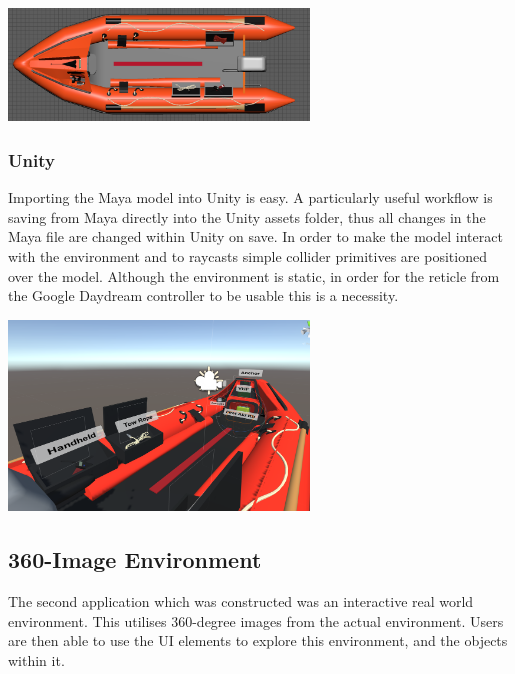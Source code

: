 \documentclass[a4paper, openright, twoside]{report}
\begin{document}
\begin{center}
\hfill \break
\includegraphics[width=0.6\textwidth]{images/top_model}
\label{model}
\hfill \break
\end{center}


\subsubsection{Unity}
Importing the Maya model into Unity is easy. A particularly useful workflow is saving from Maya directly into the Unity assets folder, thus all changes in the Maya file are changed within Unity on save. In order to make the model interact with the environment and to raycasts simple collider primitives are positioned over the model. Although the environment is static, in order for the reticle from the Google Daydream controller to be usable this is a necessity.  

\begin{center}
\hfill \break
\includegraphics[width=0.6\textwidth]{images/model_unity}
\label{model}
\hfill \break
\end{center}

\subsection{360-Image Environment}
The second application which was constructed was an interactive real world environment. This utilises 360-degree images from the actual environment. Users are then able to use the UI elements to explore this environment, and the objects within it. 
\end{document}
